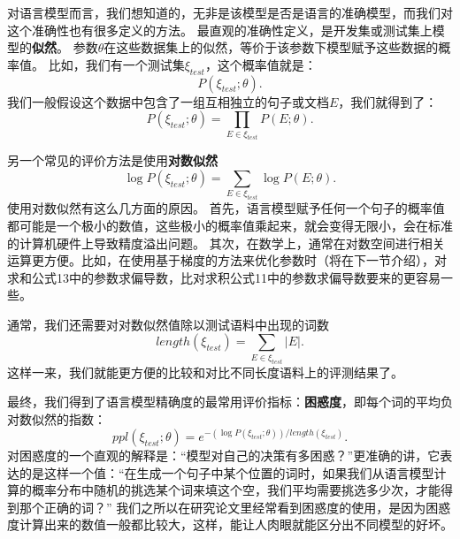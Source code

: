 \documentclass[10pt,a4paper]{ctexart}
\begin{document}
对语言模型而言，我们想知道的，无非是该模型是否是语言的准确模型，而我们对这个准确性也有很多定义的方法。
最直观的准确性定义，是开发集或测试集上模型的\textbf{似然}。
参数$\theta$在这些数据集上的似然，等价于该参数下模型赋予这些数据的概率值。
比如，我们有一个测试集$\xi_{test}$，这个概率值就是：
\[
 P(\xi_{test};\theta).
\]
我们一般假设这个数据中包含了一组互相独立的句子或文档$E$，我们就得到了：
\[
 P(\xi_{test};\theta) = \prod_{E \in \xi_{test}} P(E;\theta).
\]

另一个常见的评价方法是使用\textbf{对数似然}
\[
 \log P(\xi_{test};\theta) = \sum_{E \in \xi_{test}} \log P(E;\theta).
\]
使用对数似然有这么几方面的原因。
首先，语言模型赋予任何一个句子的概率值都可能是一个极小的数值，这些极小的概率值乘起来，就会变得无限小，会在标准的计算机硬件上导致精度溢出问题。
其次，在数学上，通常在对数空间进行相关运算更方便。比如，在使用基于梯度的方法来优化参数时（将在下一节介绍），对求和公式13中的参数求偏导数，比对求积公式11中的参数求偏导数要来的更容易一些。

通常，我们还需要对对数似然值除以测试语料中出现的词数
\[
 length(\xi_{test}) = \sum_{E \in \xi_{test}} |E|.
\]
这样一来，我们就能更方便的比较和对比不同长度语料上的评测结果了。

最终，我们得到了语言模型精确度的最常用评价指标：\textbf{困惑度}，即每个词的平均负对数似然的指数：
\[
 ppl(\xi_{test};\theta) = e^{-(\log P(\xi_{test};\theta))/length(\xi_{test})}.
\]
对困惑度的一个直观的解释是：“模型对自己的决策有多困惑？”更准确的讲，它表达的是这样一个值：“在生成一个句子中某个位置的词时，如果我们从语言模型计算的概率分布中随机的挑选某个词来填这个空，我们平均需要挑选多少次，才能得到那个正确的词？”
我们之所以在研究论文里经常看到困惑度的使用，是因为困惑度计算出来的数值一般都比较大，这样，能让人肉眼就能区分出不同模型的好坏。
\end{document}
